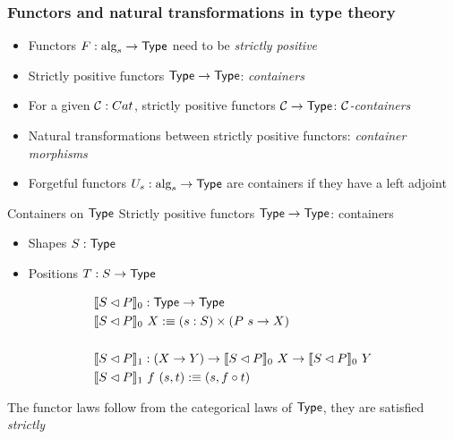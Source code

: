 \documentclass{beamer}
\begin{document}
\begin{frame}
  \frametitle{Functors and natural transformations in type theory}

  \begin{itemize}
  \item Functors $F : \mbox{alg}_{s} \to \mathsf{Type}$ need to be \emph{strictly
    positive}
  \item Strictly positive functors $\mathsf{Type} \to \mathsf{Type}$: \emph{containers}
  \item For a given $\mathcal{C} : Cat$, strictly positive functors
    $\mathcal{C} \to \mathsf{Type}$: \emph{$\mathcal{C}$-containers}
  \item Natural transformations between strictly positive functors: \emph{container morphisms}
  \item Forgetful functors $U_s : \mbox{alg}_{s} \to \mathsf{Type}$ are containers if they have a left adjoint
  \end{itemize}
\end{frame}

\begin{frame}{Containers on $\mathsf{Type}$}
  Strictly positive functors $\mathsf{Type} \to \mathsf{Type}$: containers

  \begin{itemize}
  \item Shapes $S : \mathsf{Type}$
  \item Positions $T : S \to \mathsf{Type}$
  \end{itemize}

  \begin{align*}
  &\llbracket S \lhd P \rrbracket_0 : \mathsf{Type} \to \mathsf{Type} \\
  &\llbracket S \lhd P \rrbracket_0\ X :\equiv (s : S) \times (P\ s \to X) \\
    \\
  &\llbracket S \lhd P \rrbracket_1 : (X \to Y) \to \llbracket S \lhd P \rrbracket_0\ X \to \llbracket S \lhd P \rrbracket_0\ Y \\
  &\llbracket S \lhd P \rrbracket_1\ f\ (s , t) :\equiv (s , f \circ t)
  \end{align*}

  The functor laws follow from the categorical laws of $\mathsf{Type}$, \ie
  they are satisfied \emph{strictly}
\end{frame}
\end{document}
